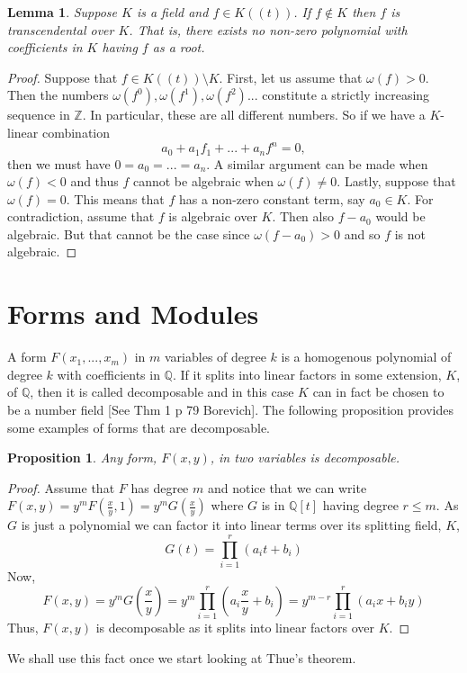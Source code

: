 \documentclass{article}
\newtheorem{proposition}{Proposition}[section]
\newtheorem{lemma}{Lemma}[section]
\newcommand{\mbb}[1]{\mathbb{#1}}
\begin{document}
\begin{lemma}\label{lem: Unit power series is transcendental}
    Suppose $K$ is a field and $f \in K((t))$. If $f \notin K$ then $f$ is transcendental over $K$. That is, there exists no non-zero polynomial with coefficients in $K$ having $f$ as a root. 
\end{lemma}
\begin{proof}
    Suppose that $f \in K((t)) \setminus K$. First, let us assume that $\omega(f) > 0$. Then the numbers $\omega(f^0), \omega(f^1),\omega(f^2) ...$ constitute a strictly increasing sequence in $\mbb Z$. In particular, these are all different numbers. So if we have a $K$-linear combination
    $$a_0 + a_1 f_1 + ... + a_nf^n = 0,$$
    then we must have $0 = a_0 = ... = a_n$. A similar argument can be made when $\omega(f) < 0$ and thus $f$ cannot be algebraic when $\omega(f) \neq 0$. Lastly, suppose that $\omega(f) = 0$. This means that $f$ has a non-zero constant term, say $a_0 \in K$. For contradiction, assume that $f$ is algebraic over $K$. Then also $f - a_0$ would be algebraic. But that cannot be the case since $\omega(f - a_0) > 0$ and so $f$ is not algebraic.  
\end{proof}



\section{Forms and Modules}
A form $F(x_1, ..., x_m)$ in $m$ variables of degree $k$ is a homogenous polynomial of degree $k$ with coefficients in $\mbb{Q}$. If it splits into linear factors in some extension, $K$, of $\mbb{Q}$, then it is called decomposable and in this case $K$ can in fact be chosen to be a number field [See Thm 1 p 79 Borevich]. The following proposition provides some examples of forms that are decomposable.

\begin{proposition}\label{prop: Forms of two variables are decomposable}
    Any form, $F(x,y)$, in two variables is decomposable.
\end{proposition}
\begin{proof}
    Assume that $F$ has degree $m$ and notice that we can write $F(x, y) = y^mF(\frac{x}{y}, 1) = y^m G(\frac{x}{y})$ where $G$ is in $\mbb Q[t]$ having degree $r \leq m$. As $G$ is just a polynomial we can factor it into linear terms over its splitting field, $K$,
    $$G(t) = \prod_{i=1}^r(a_it + b_i)$$
    Now,
    $$F(x,y) = y^m G(\frac{x}{y}) = y^m \prod_{i=1}^r(a_i\frac{x}{y} + b_i) = y^{m-r}\prod_{i=1}^r(a_ix + b_iy) $$
    Thus, $F(x,y)$ is decomposable as it splits into linear factors over $K$. 

\end{proof}
We shall use this fact once we start looking at Thue's theorem. 
\end{document}
